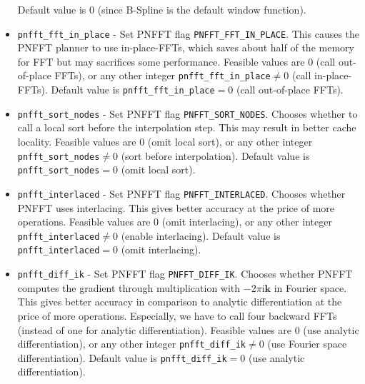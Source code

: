\begin{itemize}
    Default value is $0$ (since B-Spline is the default window function).
  \item \verb!pnfft_fft_in_place! -
    Set PNFFT flag \verb!PNFFT_FFT_IN_PLACE!. This causes the PNFFT planner to use in-place-FFTs, which saves about half of the memory for FFT but may sacrifices some performance.
    Feasible values are $0$ (call out-of-place FFTs), or any other integer \verb!pnfft_fft_in_place!$\ne0$ (call in-place-FFTs).
    Default value is \verb!pnfft_fft_in_place!$=0$ (call out-of-place FFTs).
  \item \verb!pnfft_sort_nodes! -
    Set PNFFT flag \verb!PNFFT_SORT_NODES!. Chooses whether to call a local sort before the interpolation step. This may result in better cache locality.
    Feasible values are $0$ (omit local sort), or any other integer \verb!pnfft_sort_nodes!$\ne0$ (sort before interpolation).
    Default value is \verb!pnfft_sort_nodes!$=0$ (omit local sort).
  \item \verb!pnfft_interlaced! -
    Set PNFFT flag \verb!PNFFT_INTERLACED!. Chooses whether PNFFT uses interlacing. This gives better accuracy at the price of more operations.
    Feasible values are $0$ (omit interlacing), or any other integer \verb!pnfft_interlaced!$\ne0$ (enable interlacing).
    Default value is \verb!pnfft_interlaced!$=0$ (omit interlacing).
  \item \verb!pnfft_diff_ik! -
    Set PNFFT flag \verb!PNFFT_DIFF_IK!. Chooses whether PNFFT computes the gradient through multiplication with $-2\pi\textrm{i}\mathbf{k}$ in Fourier space.
    This gives better accuracy in comparison to analytic differentiation at the price of more operations. Especially, we have to call four backward FFTs (instead of one for analytic differentiation).
    Feasible values are $0$ (use analytic differentiation), or any other integer \verb!pnfft_diff_ik!$\ne0$ (use Fourier space differentiation).
    Default value is \verb!pnfft_diff_ik!$=0$ (use analytic differentiation).

\end{itemize}
